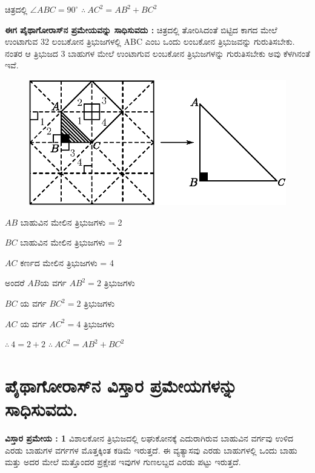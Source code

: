ಚಿತ್ರದಲ್ಲಿ $\angle ABC = 90^\circ$ $\therefore ~ AC^2 =  AB^2 +  BC^2 $

\medskip

\noindent
\textbf{ಈಗ ಪೈಥಾಗೋರಾಸ್‌ನ ಪ್ರಮೇಯವನ್ನು ಸಾಧಿಸುವದು :} ಚಿತ್ರದಲ್ಲಿ ತೋರಿಸಿದಂತೆ ಬಿಟ್ಟಿದ ಕಾಗದ ಮೇಲೆ ಉಂಟಾಗುವ 32 ಲಂಬಕೋನ ತ್ರಿಭುಜಗಳಲ್ಲಿ ABC ಎಂಬ ಒಂದು ಲಂಬಕೋನ ತ್ರಿಭುಜವನ್ನು ಗುರುತಿಸಬೇಕು. ನಂತರ ಆ ತ್ರಿಭುಜದ 3 ಬಾಹುಗಳ ಮೇಲೆ ಉಂಟಾಗುವ ಲಂಬಕೋನ ತ್ರಿಭುಜಗಳನ್ನು ಗುರುತಿಸಬೇಕು ಅವು ಕೆಳಗಿನಂತೆ ಇವೆ. 
\begin{figure}[H]
\centering
\includegraphics{src/figure/chap1/fig1-17e.eps}
\end{figure} 

$AB$ ಬಾಹುವಿನ ಮೇಲಿನ ತ್ರಿಭುಜಗಳು = 2 

\smallskip

$BC$ ಬಾಹುವಿನ ಮೇಲಿನ ತ್ರಿಭುಜಗಳು  = 2

\smallskip

$AC$ ಕರ್ಣದ ಮೇಲಿನ ತ್ರಿಭುಜಗಳು = 4
\smallskip

ಅಂದರೆ  $AB$ಯ ವರ್ಗ $AB^2 =2 $ ತ್ರಿಭುಜಗಳು 

\smallskip
$BC$ ಯ ವರ್ಗ $BC^2 = 2 $  ತ್ರಿಭುಜಗಳು

\smallskip
$AC$ ಯ ವರ್ಗ $AC^2 = 4$  ತ್ರಿಭುಜಗಳು

\smallskip
$\therefore ~ 4 = 2+2$ \quad $\therefore ~ AC^2 = AB^2 + BC^2$


\section*{ಪೈಥಾಗೋರಾಸ್‌ನ ವಿಸ್ತಾರ ಪ್ರಮೇಯಗಳನ್ನು ಸಾಧಿಸುವದು.}

\noindent
\textbf{ವಿಸ್ತಾರ ಪ್ರಮೇಯ : 1} ವಿಶಾಲಕೋನ ತ್ರಿಭುಜದಲ್ಲಿ ಲಘುಕೋನಕ್ಕೆ ಎದುರಾಗಿರುವ ಬಾಹುವಿನ ವರ್ಗವು ಉಳಿದ ಎರಡು ಬಾಹುಗಳ ವರ್ಗಗಳ ಮೊತ್ತಕ್ಕಿಂತ ಕಡಿಮೆ ಇರುತ್ತದೆ. ಈ ವ್ಯತ್ಯಾಸವು ಎರಡು ಬಾಹುಗಳಲ್ಲಿ ಒಂದು ಬಾಹು ಮತ್ತು ಅದರ ಮೇಲೆ ಮತ್ತೊಂದರ ಪ್ರಕ್ಷೇಪ ಇವುಗಳ ಗುಣಲಬ್ದದ ಎರಡು ಪಟ್ಟು ಇರುತ್ತದೆ. 

